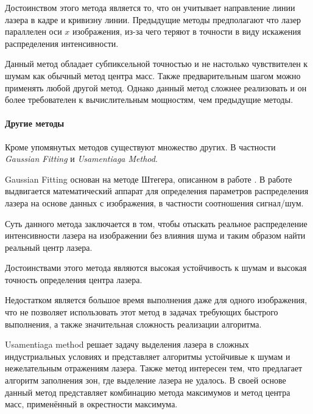                 Достоинством этого метода является то, что он учитывает направление линии лазера в кадре и кривизну линии. Предыдущие методы предполагают что лазер параллелен оси $ x $ изображения, из-за чего теряют в точности в виду искажения распределения интенсивности.
                
                Данный метод обладает субпиксельной точностью и не настолько чувствителен к шумам как обычный метод центра масс. Также предварительным шагом можно применять любой другой метод. Однако данный метод сложнее реализовать и он более требователен к вычислительным мощностям, чем предыдущие методы.
                
            \paragraph{Другие методы}
                Кроме упомянутых методов существуют множество других. В частности \textit{Gaussian Fitting}\cite{Qi2013} и \textit{Usamentiaga Method}\cite{Usamentiaga2012}.
                
                Gaussian Fitting основан на методе Штегера, описанном в работе \cite{Steger2000}. В работе \cite{Qi2013} выдвигается математический аппарат для определения параметров распределения лазера на основе данных с изображения, в частности соотношения сигнал/шум.
                
                Суть данного метода заключается в том, чтобы отыскать реальное распределение интенсивности лазера на изображении без влияния шума и таким образом найти реальный центр лазера.
                
                Достоинствами этого метода являются высокая устойчивость к шумам и высокая точность определения центра лазера.
                
                Недостатком является большое время выполнения даже для одного изображения, что не позволяет использовать этот метод в задачах требующих быстрого выполнения, а также значительная сложность реализации алгоритма.
                
                Usamentiaga method решает задачу выделения лазера в сложных индустриальных условиях и представляет алгоритмы устойчивые к шумам и нежелательным отражениям лазера. Также метод интересен тем, что предлагает алгоритм заполнения зон, где выделение лазера не удалось. В своей основе данный метод представляет комбинацию метода максимумов и метод центра масс, применённый в окрестности максимума.
                
